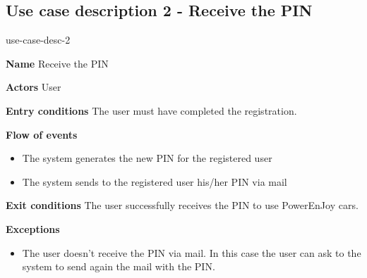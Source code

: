 \subsection{Use case description 2 - Receive the PIN}
\begin{labeling}{use-case-desc-2}
		\item[\textbf{Name}] Receive the PIN
		\item[\textbf{Actors}] User
		\item[\textbf{Entry conditions}] The user must have completed the registration.
		\item[\textbf{Flow of events}]
			\begin{itemize}
				\item[]
				\item The system generates the new PIN for the registered user
				\item The system sends to the registered user his/her PIN via mail
			\end{itemize}
		\item[\textbf{Exit conditions}] The user successfully receives the PIN to use PowerEnJoy cars.
		\item[\textbf{Exceptions}]
			\begin{itemize}
				\item[]
				\item The user doesn’t receive the PIN via mail. In this case the user can ask to the system to send again the mail with the PIN.
			\end{itemize}
	\end{labeling}

